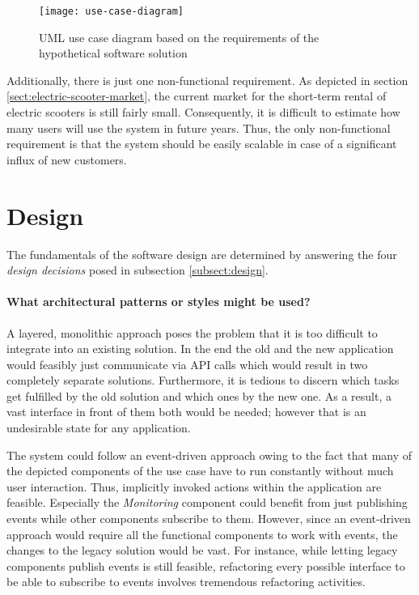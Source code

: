 \documentclass[12pt,a4paper,twoside]{report}
\begin{document}
\begin{figure}[htbp]
\centering
\texttt{[image: use-case-diagram]}
\caption{UML use case diagram based on the requirements of the hypothetical software solution}
\label{fig:use-case-diagram}
\end{figure}

Additionally, there is just one non-functional requirement.
As depicted in section \ref{sect:electric-scooter-market}, the current market
for the short-term rental of electric scooters is still fairly small.
Consequently, it is difficult to estimate how many users will use the system
in future years. Thus, the only non-functional requirement is that the system
should be easily scalable in case of a significant influx of new customers.


\section{Design}

The fundamentals of the software design are determined by answering the four
\textit{design decisions} posed in subsection \ref{subsect:design}.

\paragraph{What architectural patterns or styles might be used?}
A layered, monolithic approach poses the problem that it is too difficult
to integrate into an existing solution. In the end the old and the new
application would feasibly just communicate via API calls which would result
in two completely separate solutions. Furthermore, it is tedious to discern
which tasks get fulfilled by the old solution and which ones by the new one.
As a result, a vast interface in front of them both would be needed;
however that is an undesirable state for any application.

The system could follow an event-driven approach owing to the fact that
many of the depicted components of the use case have to run constantly without
much user interaction. Thus, implicitly invoked actions within the application
are feasible. Especially the \textit{Monitoring} component could benefit from
just publishing events while other components subscribe to them.
However, since an event-driven approach would require all the
functional components to work with events, the changes to the legacy solution
would be vast. For instance, while letting legacy components publish events
is still feasible, refactoring every possible interface to be able
to subscribe to events involves tremendous refactoring activities.
\end{document}
